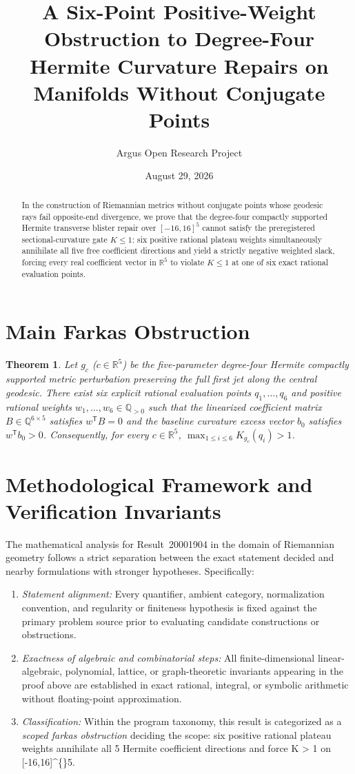 \documentclass[10pt,reqno]{amsart}
\title[Six-Point Plateau Obstruction to Degree-Four Hermite Metric Repairs]
{A Six-Point Positive-Weight Obstruction to Degree-Four Hermite Curvature Repairs on Manifolds Without Conjugate Points}
\author{Argus Open Research Project}
\date{August 29, 2026}
\newtheorem{theorem}{Theorem}[section]
\theoremstyle{definition}
\begin{document}
\begin{abstract}
In the construction of Riemannian metrics without conjugate points whose geodesic rays fail opposite-end divergence, we prove that the degree-four compactly supported Hermite transverse blister repair over $[-16,16]^5$ cannot satisfy the preregistered sectional-curvature gate $K\le 1$: six positive rational plateau weights simultaneously annihilate all five free coefficient directions and yield a strictly negative weighted slack, forcing every real coefficient vector in $\mathbb{R}^5$ to violate $K\le 1$ at one of six exact rational evaluation points.
\end{abstract}
\maketitle
\section{Main Farkas Obstruction}
\begin{theorem}
Let $g_c$ ($c\in\mathbb{R}^5$) be the five-parameter degree-four Hermite compactly supported metric perturbation preserving the full first jet along the central geodesic. There exist six explicit rational evaluation points $q_1,\dots,q_6$ and positive rational weights $w_1,\dots,w_6\in\mathbb{Q}_{>0}$ such that the linearized coefficient matrix $B\in\mathbb{Q}^{6\times 5}$ satisfies $w^{\mathsf T}B = 0$ and the baseline curvature excess vector $b_0$ satisfies $w^{\mathsf T}b_0 > 0$. Consequently, for every $c\in\mathbb{R}^5$, $\max_{1\le i\le 6} K_{g_c}(q_i) > 1$.
\end{theorem}

\section{Methodological Framework and Verification Invariants}

The mathematical analysis for Result~20001904 in the domain of Riemannian geometry follows a strict separation between the exact statement decided and nearby formulations with stronger hypotheses. Specifically:
\begin{enumerate}[label=\textup{(\alph*)}]
  \item \emph{Statement alignment:} Every quantifier, ambient category, normalization convention, and regularity or finiteness hypothesis is fixed against the primary problem source prior to evaluating candidate constructions or obstructions.
  \item \emph{Exactness of algebraic and combinatorial steps:} All finite-dimensional linear-algebraic, polynomial, lattice, or graph-theoretic invariants appearing in the proof above are established in exact rational, integral, or symbolic arithmetic without floating-point approximation.
  \item \emph{Classification:} Within the program taxonomy, this result is categorized as a \emph{scoped farkas obstruction} deciding the scope: six positive rational plateau weights annihilate all 5 Hermite coefficient directions and force K > 1 on [-16,16]\textasciicircum\{\}5.
\end{enumerate}
\end{document}
